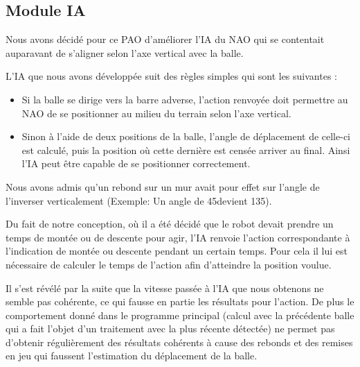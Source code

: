 \subsection{Module IA}
\label{sub:Module IA}
	\par Nous avons décidé pour ce PAO d'améliorer l'IA du NAO qui se contentait auparavant de s'aligner selon l'axe vertical avec la balle.

	\par L'IA que nous avons développée suit des règles simples qui sont les suivantes :

	\begin{itemize}
		\item Si la balle se dirige vers la barre adverse, l'action renvoyée doit permettre au NAO de se positionner au milieu du terrain selon l'axe	vertical.
		\item Sinon à l'aide de deux positions de la balle, l'angle de déplacement de celle-ci est calculé, puis la position où cette dernière est censée arriver au final.
		Ainsi l'IA peut être capable de se positionner correctement.
	\end{itemize}

	\par Nous avons admis qu'un rebond sur un mur avait pour effet sur l'angle de	l'inverser verticalement (Exemple: Un angle de 45\degre devient 135\degre).

	\par Du fait de notre conception, où il a été décidé que le robot devait prendre un temps de montée ou de descente pour agir, l'IA renvoie l'action correspondante à l'indication de montée ou descente pendant un certain temps.
	Pour cela il lui est nécessaire de calculer le temps de l'action afin	d'atteindre la position voulue.

	\par Il s'est révélé par la suite que la vitesse passée à l'IA que nous obtenons ne	semble pas cohérente, ce qui fausse en partie les résultats pour l'action.
	De plus	le comportement donné dans le programme principal (calcul avec la précédente balle qui a fait l'objet d'un traitement avec la plus récente détectée) ne permet pas d'obtenir régulièrement des résultats cohérents à cause des rebonds et des remises	en jeu qui faussent l'estimation du déplacement de la balle.
\pagebreak
